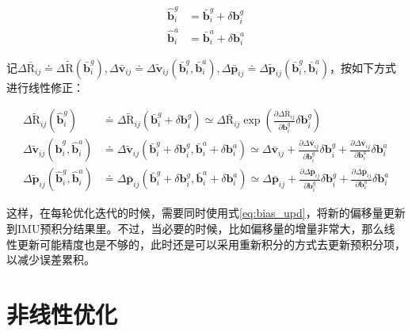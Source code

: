 \begin{equation}
\begin{aligned}
    \hat{\bm b}^g_i &= \bar{\bm b}^g_i + \delta\bm{b}^g_i \\
    \hat{\bm b}^a_i &= \bar{\bm b}^a_i + \delta\bm{b}^a_i
\end{aligned}
\end{equation}

记$\Delta\bar{\mathrm R}_{ij}\doteq\Delta\tilde{\mathrm R}(\bar{\bm b}^g_i), \Delta\bar{\bm v}_{ij}\doteq\Delta\tilde{\bm v}_{ij}(\bar{\bm b}^g_i,\bar{\bm b}^a_i), \Delta\bar{\bm p}_{ij}\doteq\Delta\tilde{\bm p}_{ij}(\bar{\bm b}^g_i,\bar{\bm b}^a_i)$，按如下方式进行线性修正：

\begin{equation}
\begin{aligned}
    \Delta\tilde{\mathrm R}_{ij}(\hat{\bm b}_i^g)
  &\doteq \Delta\tilde{\mathrm R}_{ij}(\bar{\bm b}^g_i + \delta\bm{b}^g_i)
  \simeq \Delta\bar{\mathrm R}_{ij}
  \exp\left(
      \tfrac{\partial\Delta\bar{\mathrm R}_{ij}}{\partial\bm{b}^g_i}
      \delta\bm{b}^g_i
  \right) \\
  \Delta\tilde{\bm v}_{ij}(\hat{\bm b}^g_i,\hat{\bm b}^a_i)
  &\doteq \Delta\tilde{\bm v}_{ij}(
  \bar{\bm b}^g_i + \delta\bm{b}^g_i,
  \bar{\bm b}^a_i + \delta\bm{b}^a_i)
  \simeq \Delta\bar{\bm v}_{ij} +
  \tfrac{\partial\Delta\bar{\bm v}_{ij}}{\partial\bm{b}^g_i}
  \delta\bm{b}^g_i +
  \tfrac{\partial\Delta\bar{\bm v}_{ij}}{\partial\bm{b}^a_i}
  \delta\bm{b}^a_i \\
  \Delta\tilde{\bm p}_{ij}(\hat{\bm b}^g_i,\hat{\bm b}^a_i)
  &\doteq \Delta\bar{\bm p}_{ij}(
  \bar{\bm b}^g_i + \delta\bm{b}^g_i,
  \bar{\bm b}^a_i + \delta\bm{b}^a_i)
  \simeq \Delta\bar{\bm p}_{ij} +
  \tfrac{\partial\Delta\bar{\bm p}_{ij}}{\partial\bm{b}^g_i}
  \delta\bm{b}^g_i +
  \tfrac{\partial\Delta\bar{\bm p}_{ij}}{\partial\bm{b}^a_i}
  \delta\bm{b}^a_i
\end{aligned}\label{eq:bias_upd}
\end{equation}

这样，在每轮优化迭代的时候，需要同时使用式\eqref{eq:bias_upd}，将新的偏移量更新到IMU预积分结果里。不过，当必要的时候，比如偏移量的增量非常大，那么线性更新可能精度也是不够的，此时还是可以采用重新积分的方式去更新预积分项，以减少误差累积。

\section{非线性优化}

